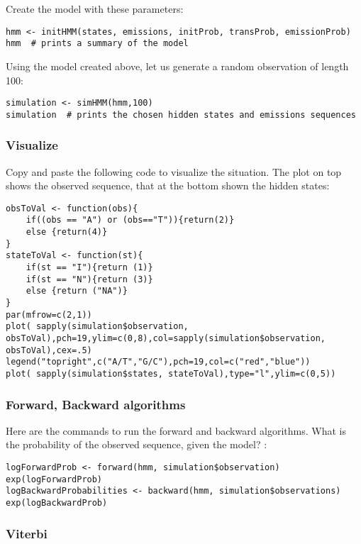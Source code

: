 \documentclass[a4paper,11pt]{article}
\begin{document}
Create the model with these parameters:

\begin{verbatim}
hmm <- initHMM(states, emissions, initProb, transProb, emissionProb)
hmm  # prints a summary of the model
\end{verbatim}

Using the model created above, let us generate a random observation of length 100:

\begin{verbatim}
simulation <- simHMM(hmm,100)
simulation  # prints the chosen hidden states and emissions sequences
\end{verbatim}

\subsubsection{Visualize}

Copy and paste the following code to visualize the situation. The plot on top shows the observed sequence,
that at the bottom shown the hidden states:

\begin{verbatim}
obsToVal <- function(obs){
	if((obs == "A") or (obs=="T")){return(2)}
	else {return(4)}
}
stateToVal <- function(st){
	if(st == "I"){return (1)}
	if(st == "N"){return (3)}
	else {return ("NA")}
}
par(mfrow=c(2,1))
plot( sapply(simulation$observation, obsToVal),pch=19,ylim=c(0,8),col=sapply(simulation$observation, obsToVal),cex=.5)
legend("topright",c("A/T","G/C"),pch=19,col=c("red","blue"))
plot( sapply(simulation$states, stateToVal),type="l",ylim=c(0,5))
\end{verbatim}

\subsubsection{Forward, Backward algorithms}

Here are the commands to run the forward and backward algorithms. What is the probability of the observed sequence, given the model? :

\begin{verbatim}
logForwardProb <- forward(hmm, simulation$observation)
exp(logForwardProb)
logBackwardProbabilities <- backward(hmm, simulation$observations)
exp(logBackwardProb)
\end{verbatim}

\subsubsection{Viterbi}
\end{document}
